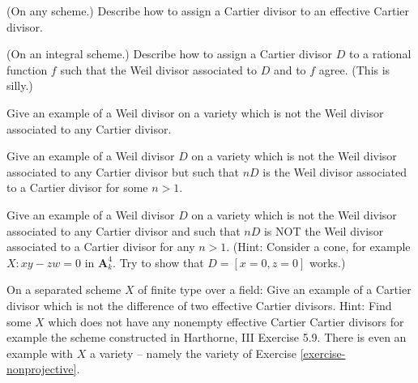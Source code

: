 \begin{exercise}
\label{exercise-effective-cartier-cartier}
(On any scheme.)
Describe how to assign a Cartier divisor to an effective Cartier divisor.
\end{exercise}

\begin{exercise}
\label{exercise-rational-function-cartier}
(On an integral scheme.)
Describe how to assign a Cartier divisor $D$ to a rational function
$f$ such that the Weil divisor associated to $D$ and to $f$ agree.
(This is silly.)
\end{exercise}

\begin{exercise}
\label{exercise-weil-not-cartier}
Give an example of a Weil divisor on a variety which is not
the Weil divisor associated to any Cartier divisor.
\end{exercise}

\begin{exercise}
\label{exercise-weil-Q-cartier}
Give an example of a Weil divisor $D$ on a variety which is not
the Weil divisor associated to any Cartier divisor but
such that $nD$ is the Weil divisor associated to a Cartier
divisor for some $n>1$.
\end{exercise}

\begin{exercise}
\label{exercise-weil-not-Q-cartier}
Give an example of a Weil divisor $D$ on a variety which is not
the Weil divisor associated to any Cartier divisor and
such that $nD$ is NOT the Weil divisor associated to a Cartier
divisor for any $n>1$.
(Hint: Consider a cone, for example $X : xy - zw = 0$ in
$\mathbf{A}^4_{k}$. Try to show that $D = [x = 0, z = 0]$ works.)
\end{exercise}

\begin{exercise}
\label{exercise-cartier-not-difference-effective-cartier}
On a separated scheme $X$ of finite type over a field:
Give an example of a Cartier divisor which is not the difference of
two effective Cartier divisors.
Hint: Find some $X$ which does not have any nonempty effective Cartier
Cartier divisors for example the scheme constructed in
Harthorne, III Exercise 5.9. There is even an example
with $X$ a variety -- namely the variety of
Exercise \ref{exercise-nonprojective}.
\end{exercise}


